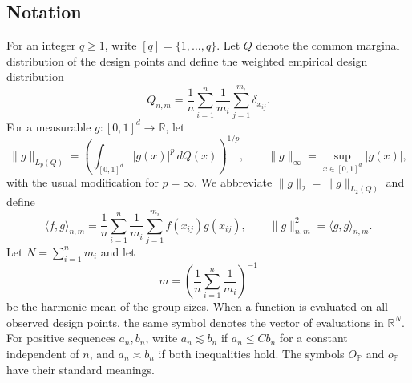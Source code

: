 \documentclass[twoside,11pt]{article}
\newenvironment{revision}{\color{revisionred}}{}
\begin{document}
\subsection{Notation}
\begin{revision}
For an integer $q\ge1$, write $[q]=\{1,\ldots,q\}$. Let $Q$ denote the common marginal distribution of the design points and define the weighted empirical design distribution
\[
 Q_{n,m}=\frac1n\sum_{i=1}^n\frac1{m_i}\sum_{j=1}^{m_i}\delta_{x_{ij}}.
\]
For a measurable $g:[0,1]^d\to\mathbb R$, let
\[
 \|g\|_{L_p(Q)}=\left(\int_{[0,1]^d}|g(x)|^p\,dQ(x)\right)^{1/p},
 \qquad \|g\|_\infty=\sup_{x\in[0,1]^d}|g(x)|,
\]
with the usual modification for $p=\infty$. We abbreviate $\|g\|_2=\|g\|_{L_2(Q)}$ and define
\[
 \langle f,g\rangle_{n,m}=\frac1n\sum_{i=1}^n\frac1{m_i}\sum_{j=1}^{m_i}f(x_{ij})g(x_{ij}),
 \qquad \|g\|_{n,m}^2=\langle g,g\rangle_{n,m}.
\]
Let $N=\sum_{i=1}^n m_i$ and let
\[
 m=\left(\frac1n\sum_{i=1}^n\frac1{m_i}\right)^{-1}
\]
be the harmonic mean of the group sizes. When a function is evaluated on all observed design points, the same symbol denotes the vector of evaluations in $\mathbb R^N$. For positive sequences $a_n,b_n$, write $a_n\lesssim b_n$ if $a_n\le Cb_n$ for a constant independent of $n$, and $a_n\asymp b_n$ if both inequalities hold. The symbols $O_{\mathbb P}$ and $o_{\mathbb P}$ have their standard meanings.
\end{revision}
\end{document}
